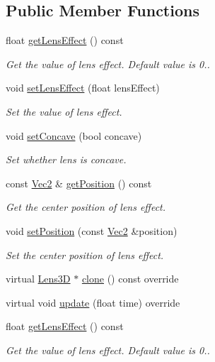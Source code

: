 \subsection*{Public Member Functions}
\begin{DoxyCompactItemize}
\item 
float \hyperlink{classLens3D_ac8fca5cf505e98c77be66bfbf9483438}{get\+Lens\+Effect} () const
\begin{DoxyCompactList}\small\item\em Get the value of lens effect. Default value is 0.. \end{DoxyCompactList}\item 
void \hyperlink{classLens3D_abd9544a7f5363453a0b882b7e92eefdd}{set\+Lens\+Effect} (float lens\+Effect)
\begin{DoxyCompactList}\small\item\em Set the value of lens effect. \end{DoxyCompactList}\item 
void \hyperlink{classLens3D_a76df2e34885baea1eb3e83506f71ac98}{set\+Concave} (bool concave)
\begin{DoxyCompactList}\small\item\em Set whether lens is concave. \end{DoxyCompactList}\item 
const \hyperlink{classVec2}{Vec2} \& \hyperlink{classLens3D_ad4981a40ade698e4a98bc2f1196810aa}{get\+Position} () const
\begin{DoxyCompactList}\small\item\em Get the center position of lens effect. \end{DoxyCompactList}\item 
void \hyperlink{classLens3D_a1d9650798d3531090fef66a64da15be8}{set\+Position} (const \hyperlink{classVec2}{Vec2} \&position)
\begin{DoxyCompactList}\small\item\em Set the center position of lens effect. \end{DoxyCompactList}\item 
virtual \hyperlink{classLens3D}{Lens3D} $\ast$ \hyperlink{classLens3D_a7b97fe4349267d8a3a7404e8bc19aa33}{clone} () const override
\item 
virtual void \hyperlink{classLens3D_a927eb7e63d32fd9f2f8db744524d380f}{update} (float time) override
\item 
float \hyperlink{classLens3D_ac8fca5cf505e98c77be66bfbf9483438}{get\+Lens\+Effect} () const
\begin{DoxyCompactList}\small\item\em Get the value of lens effect. Default value is 0.. \end{DoxyCompactList}\item 

\end{DoxyCompactItemize}
